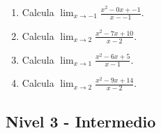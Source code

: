 \documentclass[11pt,a4paper]{article}
\begin{document}
\begin{enumerate}[label=\textbf{E\arabic*.},start=221]
\item Calcula $\displaystyle\lim_{x\to -1}\frac{x^2-0x+-1}{x--1}$. 

\item Calcula $\displaystyle\lim_{x\to 2}\frac{x^2-7x+10}{x-2}$. 

\item Calcula $\displaystyle\lim_{x\to 1}\frac{x^2-6x+5}{x-1}$. 

\item Calcula $\displaystyle\lim_{x\to 2}\frac{x^2-9x+14}{x-2}$. 

\end{enumerate}

\newpage

\subsection{Nivel 3 - Intermedio}
\end{document}
